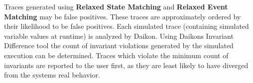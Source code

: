 Traces generated using \textbf{Relaxed State Matching} and \textbf{Relaxed
Event Matching} may be false positives. These traces are approximately ordered by
their likelihood to be false positives. Each simulated trace (containing
simulated variable values at runtime) is analyzed by Daikon. Using Daikons
Invariant Difference tool the count of invariant violations generated by the
simulated execution can be determined. Traces which violate the minimum count
of invariants are reported to the user first, as they are least likely to have
diverged from the systems real behavior.


